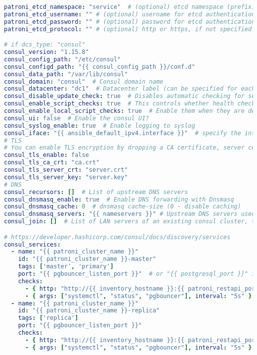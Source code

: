 \begin{flushleft}
\begin{lstlisting}[language=yaml, caption=Testsystem - Deployment - main.yml,captionpos=b,label={lst:testsystem-deployment-main.yml},breaklines=true]
patroni_etcd_namespace: "service"  # (optional) etcd namespace (prefix)
patroni_etcd_username: "" # (optional) username for etcd authentication
patroni_etcd_password: "" # (optional) password for etcd authentication
patroni_etcd_protocol: "" # (optional) http or https, if not specified http is used

# if dcs_type: "consul"
consul_version: "1.15.8"
consul_config_path: "/etc/consul"
consul_configd_path: "{{ consul_config_path }}/conf.d"
consul_data_path: "/var/lib/consul"
consul_domain: "consul"  # Consul domain name
consul_datacenter: "dc1"  # Datacenter label (can be specified for each host in the inventory)
consul_disable_update_check: true  # Disables automatic checking for security bulletins and new version releases
consul_enable_script_checks: true  # This controls whether health checks that execute scripts are enabled on this agent
consul_enable_local_script_checks: true  # Enable them when they are defined in the local configuration files
consul_ui: false  # Enable the consul UI?
consul_syslog_enable: true  # Enable logging to syslog
consul_iface: "{{ ansible_default_ipv4.interface }}"  # specify the interface name with a Private IP (ex. "enp7s0")
# TLS
# You can enable TLS encryption by dropping a CA certificate, server certificate, and server key in roles/consul/files/
consul_tls_enable: false
consul_tls_ca_crt: "ca.crt"
consul_tls_server_crt: "server.crt"
consul_tls_server_key: "server.key"
# DNS
consul_recursors: []  # List of upstream DNS servers
consul_dnsmasq_enable: true  # Enable DNS forwarding with Dnsmasq
consul_dnsmasq_cache: 0  # dnsmasq cache-size (0 - disable caching)
consul_dnsmasq_servers: "{{ nameservers }}" # Upstream DNS servers used by dnsmasq
consul_join: []  # List of LAN servers of an existing consul cluster, to join.

# https://developer.hashicorp.com/consul/docs/discovery/services
consul_services:
  - name: "{{ patroni_cluster_name }}"
    id: "{{ patroni_cluster_name }}-master"
    tags: ['master', 'primary']
    port: "{{ pgbouncer_listen_port }}"  # or "{{ postgresql_port }}" if pgbouncer_install: false
    checks:
      - { http: "http://{{ inventory_hostname }}:{{ patroni_restapi_port }}/primary", interval: "2s" }
      - { args: ["systemctl", "status", "pgbouncer"], interval: "5s" }  # comment out this check if pgbouncer_install: false
  - name: "{{ patroni_cluster_name }}"
    id: "{{ patroni_cluster_name }}-replica"
    tags: ['replica']
    port: "{{ pgbouncer_listen_port }}"
    checks:
      - { http: "http://{{ inventory_hostname }}:{{ patroni_restapi_port }}/replica?lag={{ patroni_maximum_lag_on_replica }}", interval: "2s" }
      - { args: ["systemctl", "status", "pgbouncer"], interval: "5s" }


\end{lstlisting}
\end{flushleft}
